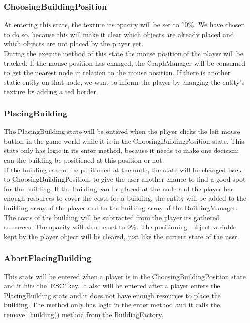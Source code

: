 \subsubsection{ChoosingBuildingPosition} 
At entering this state, the texture its opacity will be set to 70\%. We have 
chosen to do so, because this will make it clear which objects are already 
placed and which objects are not placed by the player yet.\\ During the 
execute method of this state the mouse position of the player will be tracked. 
If the mouse position has changed, the GraphManager will be consumed to get 
the nearest node in relation to the mouse position. If there is another static 
entity on that node, we want to inform the player by changing the entity's 
texture by adding a red border.

\subsubsection{PlacingBuilding} 
The PlacingBuilding state will be entered when the player clicks the left 
mouse button in the game world while it is in the ChoosingBuildingPosition 
state. This state only has logic in its enter method, because it needs to 
make one decision: can the building be positioned at this position or not.\\ 
If the building cannot be positioned at the node, the state will be changed 
back to ChoosingBuildingPosition, to give the user another chance to find a 
good spot for the building. If the building can be placed at the node and the 
player has enough resources to cover the costs for a building, the entity will 
be added to the building array of the player and to the building array of the 
BuildingManager. The costs of the building will be subtracted from the player 
its gathered resources. The opacity will also be set to 0\%. The 
positioning\_object variable kept by the player object will be cleared, just 
like the current state of the user.

\subsubsection{AbortPlacingBuilding} 
\label{AbortPlacingBuilding} 
This state will be entered when a player is in the ChoosingBuildingPosition 
state and it hits the 'ESC' key. It also will be entered after a player enters 
the PlacingBuilding state and it does not have enough resources to place the 
building. The method only has logic in the enter method and it calls the 
remove\_building() method from the BuildingFactory. 

